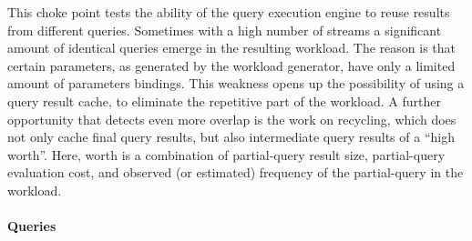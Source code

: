 
This choke point tests the ability of the query execution engine to reuse results from different queries. Sometimes with a high number of streams a significant amount of identical queries emerge in the resulting workload.
The reason is that certain parameters, as generated by the workload generator, have only a limited amount of parameters bindings.
This weakness opens up the possibility of using a query result cache, to eliminate the repetitive part of the workload.
A further opportunity that detects even more overlap is the work on recycling, which does not only cache final query results, but also intermediate query results of a ``high worth''.
Here, worth is a combination of partial-query result size, partial-query evaluation cost, and observed (or estimated) frequency of the partial-query in the workload.


\paragraph{Queries}
{\raggedright

}